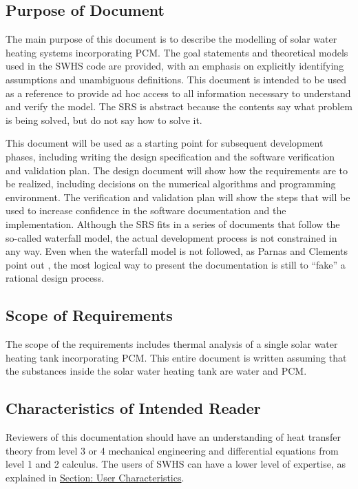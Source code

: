 \documentclass[12pt]{article}
\begin{document}
\subsection{Purpose of Document}
\label{Sec:DocPurpose}
The main purpose of this document is to describe the modelling of solar water heating systems incorporating PCM. The goal statements and theoretical models used in the SWHS code are provided, with an emphasis on explicitly identifying assumptions and unambiguous definitions. This document is intended to be used as a reference to provide ad hoc access to all information necessary to understand and verify the model. The SRS is abstract because the contents say what problem is being solved, but do not say how to solve it.

This document will be used as a starting point for subsequent development phases, including writing the design specification and the software verification and validation plan. The design document will show how the requirements are to be realized, including decisions on the numerical algorithms and programming environment. The verification and validation plan will show the steps that will be used to increase confidence in the software documentation and the implementation. Although the SRS fits in a series of documents that follow the so-called waterfall model, the actual development process is not constrained in any way. Even when the waterfall model is not followed, as Parnas and Clements point out \cite{parnasClements1986}, the most logical way to present the documentation is still to ``fake'' a rational design process.

\subsection{Scope of Requirements}
\label{Sec:ReqsScope}
The scope of the requirements includes thermal analysis of a single solar water heating tank incorporating PCM. This entire document is written assuming that the substances inside the solar water heating tank are water and PCM.

\subsection{Characteristics of Intended Reader}
\label{Sec:ReaderChars}
Reviewers of this documentation should have an understanding of heat transfer theory from level 3 or 4 mechanical engineering and differential equations from level 1 and 2 calculus. The users of SWHS can have a lower level of expertise, as explained in \hyperref[Sec:UserChars]{Section: User Characteristics}.
\end{document}
